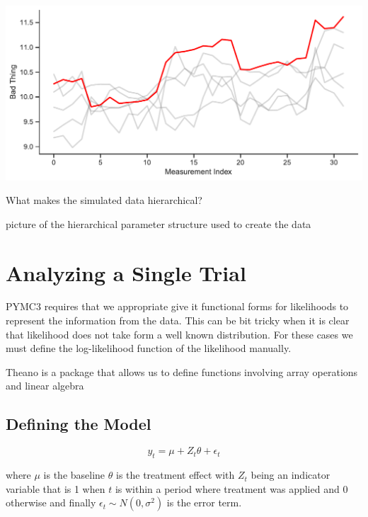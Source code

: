 \documentclass[12pt,a4paper,leqno]{report}
\theoremstyle{plain}
\theoremstyle{definition}
\theoremstyle{remark}
\begin{document}
\bigskip
{
    \centering
    \includegraphics[width=\textwidth,height=\textheight,keepaspectratio]{measurements_timeline.pdf}
    \par
}
\bigskip



What makes the simulated data hierarchical?

picture of the hierarchical parameter structure used to create the data

\section{Analyzing a Single Trial}\label{1trial}

PYMC3 requires that we appropriate give it functional forms for likelihoods to represent
the information from the data. This can be bit tricky when it is clear that likelihood
does not take form a well known distribution. For these cases we must define the
log-likelihood function of the likelihood manually.

Theano is a package that allows us to define functions involving array operations and
linear algebra

\subsection{Defining the Model}\label{1model}

\begin{def}\label{simulationmodel}
    \begin{equation}\label{}
        y_t = \mu + Z_t\theta + \epsilon_t
    \end{equation}
\end{def}where \(\mu\) is the baseline \(\theta\) is the treatment effect with \(Z_t\)
being an indicator variable that is 1 when \(t\) is within a period where treatment was
applied and 0 otherwise and finally \(\epsilon_t \sim N(0,\sigma^2) \) is the error term.
\end{document}
